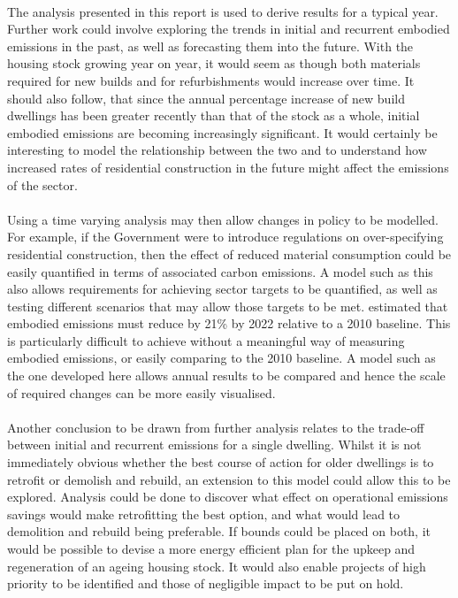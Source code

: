 \documentclass[12pt]{article}
\begin{document}
\paragraph{}
The analysis presented in this report is used to derive results for a typical year. Further work could involve exploring the trends in initial and recurrent embodied emissions in the past, as well as forecasting them into the future. With the housing stock growing year on year, it would seem as though both materials required for new builds and for refurbishments would increase over time. It should also follow, that since the annual percentage increase of new build dwellings has been greater recently than that of the stock as a whole, initial embodied emissions are becoming increasingly significant. It would certainly be interesting to model the relationship between the two and to understand how increased rates of residential construction in the future might affect the emissions of the sector.

\paragraph{}
Using a time varying analysis may then allow changes in policy to be modelled. For example, if the Government were to introduce regulations on over-specifying residential construction, then the effect of reduced material consumption could be easily quantified in terms of associated carbon emissions. A model such as this also allows requirements for achieving sector targets to be quantified, as well as testing different scenarios that may allow those targets to be met. \citet{The_Green_Construction_Board2013-vo} estimated that embodied emissions must reduce by 21\% by 2022 relative to a 2010 baseline. This is particularly difficult to achieve without a meaningful way of measuring embodied emissions, or easily comparing to the 2010 baseline. A model such as the one developed here allows annual results to be compared and hence the scale of required changes can be more easily visualised.

\paragraph{}
Another conclusion to be drawn from further analysis relates to the trade-off between initial and recurrent emissions for a single dwelling. Whilst it is not immediately obvious whether the best course of action for older dwellings is to retrofit or demolish and rebuild, an extension to this model could allow this to be explored. Analysis could be done to discover what effect on operational emissions savings would make retrofitting the best option, and what would lead to demolition and rebuild being preferable. If bounds could be placed on both, it would be possible to devise a more energy efficient plan for the upkeep and regeneration of an ageing housing stock. It would also enable projects of high priority to be identified and those of negligible impact to be put on hold.
\end{document}
